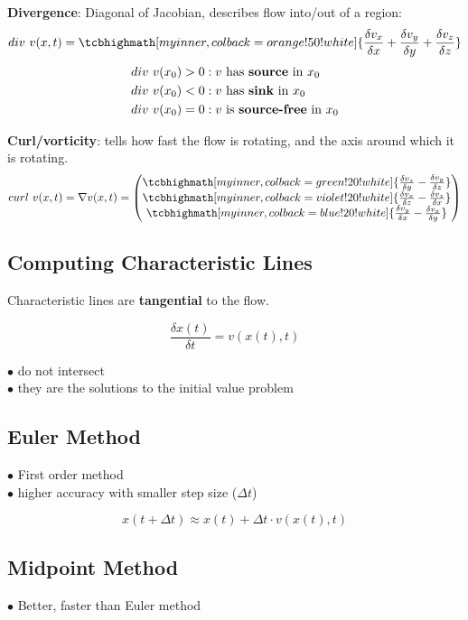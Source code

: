 \textbf{Divergence}: Diagonal of Jacobian, describes flow into/out of a region:
$$div\ v(x, t) = \tcbhighmath[myinner, colback=orange!50!white]{\frac{\delta v_x}{\delta x} + \frac{\delta v_y}{\delta y} + \frac{\delta v_z}{\delta z}}$$
\begin{align*}
    div\ v(x_0) > 0 & : v\text{ has \textbf{source} in } x_0     \\
    div\ v(x_0) < 0 & : v\text{ has \textbf{sink} in } x_0       \\
    div\ v(x_0) = 0 & : v\text{ is \textbf{source-free} in } x_0 \\
\end{align*}

\textbf{Curl/vorticity}: tells how fast the flow is rotating, and the axis around which it is rotating.
$$curl\ v(x, t) = \nabla v(x, t) = \begin{pmatrix}
        \tcbhighmath[myinner, colback=green!20!white]{\frac{\delta v_z}{\delta y} - \frac{\delta v_y}{\delta z}}  \\
        \tcbhighmath[myinner, colback=violet!20!white]{\frac{\delta v_x}{\delta z} - \frac{\delta v_z}{\delta x}} \\
        \tcbhighmath[myinner, colback=blue!20!white]{\frac{\delta v_y}{\delta x} - \frac{\delta v_x}{\delta y}}
    \end{pmatrix}$$

\subsection{Computing Characteristic Lines}
Characteristic lines are \textbf{tangential} to the flow.

$$\frac{\delta x(t)}{\delta t} = v(x(t), t)$$

$\bullet$ do not intersect \\
$\bullet$ they are the solutions to the initial value problem

\subsection{Euler Method}
$\bullet$ First order method \\
$\bullet$ higher accuracy with smaller step size ($\Delta t$)

$$x(t + \Delta t) \approx  x(t) + \Delta t \cdot v(x(t), t)$$

\subsection{Midpoint Method}
$\bullet$ Better, faster than Euler method

